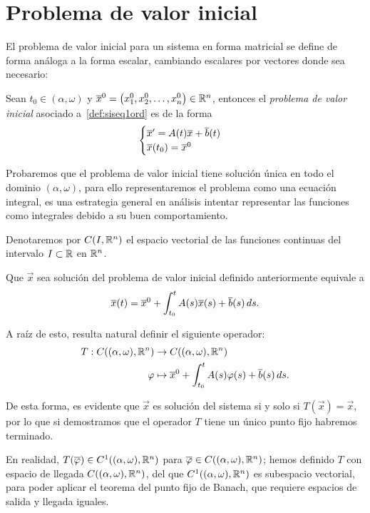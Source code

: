 \documentclass[../ecuaciones_diferenciales.tex]{subfiles}
\begin{document}
\section{Problema de valor inicial}

El problema de valor inicial para un sistema en forma matricial se define de
forma análoga a la forma escalar, cambiando escalares por vectores donde sea
necesario:

\begin{definition}
	Sean \(t_0 \in (\alpha, \omega)\) y
	\(\overline{x}^0 = \begin{pmatrix}x^0_1, x^0_2, \dots, x^0_n\end{pmatrix} \in \mathbb{R}^n\), entonces
	el \emph{problema de valor inicial} asociado a~\ref{def:siseq1ord} es de la forma
	\[\begin{cases}
		\overline{x}' = A(t)\overline{x} + \overline{b}(t) \\
		\overline{x}(t_0) = \overline{x}^0\end{cases}\]
\end{definition}

Probaremos que el problema de valor inicial tiene solución única en todo el
dominio \((\alpha, \omega)\), para ello representaremos el problema como una
ecuación integral, es una estrategia general en análisis intentar representar
las funciones como integrales debido a su buen comportamiento.

\begin{notation}
	Denotaremos por \(C(I, \mathbb{R}^n)\) el espacio vectorial de las funciones
	continuas del intervalo \(I \subset \mathbb{R}\) en \(\mathbb{R}^n\).
\end{notation}

Que \(\vec{x}\) sea solución del problema de valor inicial definido
anteriormente equivale a
\[\overline{x}(t) = \overline{x}^0 + \int_{t_0}^t A(s)\overline{x}(s) + \overline{b}(s) \mathop{d\!} s.\]

A raíz de esto, resulta natural definir el siguiente operador:
\begin{align*}
    T : C((\alpha, \omega), \mathbb{R}^n) & \to C((\alpha, \omega), \mathbb{R}^n) \\
    \varphi                          & \mapsto
    \overline{x}^0 + \int_{t_0}^t A(s) \varphi(s) + \overline{b}(s) \mathop{d\!} s.
\end{align*}

De esta forma, es evidente que \(\vec{x}\) es solución del sistema si y solo si
\(T(\vec{x}) = \vec{x}\), por lo que si demostramos que el operador \(T\) tiene
un único punto fijo habremos terminado.

\begin{remark}
	En realidad, \(T(\overline{\varphi}) \in C^1((\alpha, \omega), \mathbb{R}^n)\) para
	\(\overline{\varphi} \in C((\alpha, \omega), \mathbb{R}^n)\);
	hemos definido \(T\) con espacio de
	llegada \(C((\alpha, \omega), \mathbb{R}^n)\), del que
	\(C^1((\alpha, \omega), \mathbb{R}^n)\) es subespacio vectorial,
	para poder aplicar el teorema del punto fijo de
	Banach, que requiere espacios de salida y llegada iguales.
\end{remark}
\end{document}
